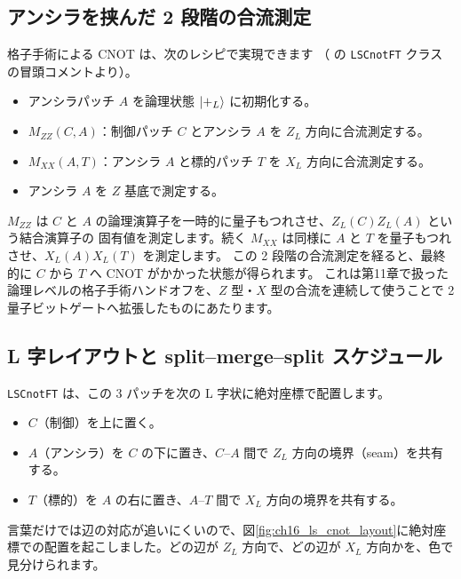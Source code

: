 \subsection{アンシラを挟んだ 2 段階の合流測定}

格子手術による CNOT は、次のレシピで実現できます
（ の \texttt{LSCnotFT} クラスの冒頭コメントより）。

\begin{itemize}
  \item アンシラパッチ $A$ を論理状態 $\ket{+_L}$ に初期化する。
  \item $M_{ZZ}(C,A)$：制御パッチ $C$ とアンシラ $A$ を $Z_L$ 方向に合流測定する。
  \item $M_{XX}(A,T)$：アンシラ $A$ と標的パッチ $T$ を $X_L$ 方向に合流測定する。
  \item アンシラ $A$ を $Z$ 基底で測定する。
\end{itemize}

$M_{ZZ}$ は $C$ と $A$ の論理演算子を一時的に量子もつれさせ、$Z_L(C)Z_L(A)$ という結合演算子の
固有値を測定します。続く $M_{XX}$ は同様に $A$ と $T$ を量子もつれさせ、$X_L(A)X_L(T)$ を測定します。
この 2 段階の合流測定を経ると、最終的に $C$ から $T$ へ CNOT がかかった状態が得られます。
これは第11章で扱った論理レベルの格子手術ハンドオフを、$Z$ 型・$X$ 型の合流を連続して使うことで
2 量子ビットゲートへ拡張したものにあたります。

\subsection{L 字レイアウトと split–merge–split スケジュール}

\texttt{LSCnotFT} は、この 3 パッチを次の L 字状に絶対座標で配置します。

\begin{itemize}
  \item $C$（制御）を上に置く。
  \item $A$（アンシラ）を $C$ の下に置き、$C$–$A$ 間で $Z_L$ 方向の境界（seam）を共有する。
  \item $T$（標的）を $A$ の右に置き、$A$–$T$ 間で $X_L$ 方向の境界を共有する。
\end{itemize}

言葉だけでは辺の対応が追いにくいので、図\ref{fig:ch16_ls_cnot_layout}に絶対座標での配置を起こしました。どの辺が $Z_L$ 方向で、どの辺が $X_L$ 方向かを、色で見分けられます。

